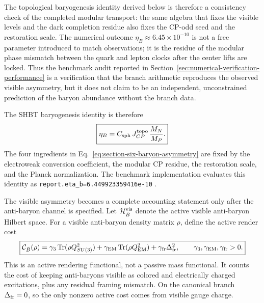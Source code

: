 \documentclass[11pt]{article}
\DeclareMathOperator{\Tr}{Tr}
\DeclareRobustCommand{\pyvar}[1]{%
  \ifmmode\text{\nolinkurl{#1}}\else\nolinkurl{#1}\fi%
}
\newcommand{\Deltafr}{\Delta_{\rm fr}}
\newcommand{\MP}{M_P}
\begin{document}
The topological baryogenesis identity derived below is therefore a consistency
check of the completed modular transport: the same algebra that fixes the
visible levels and the dark completion residue also fixes the CP-odd seed and
the restoration scale.  The numerical outcome \(\eta_B\approx6.45\times10^{-10}\)
is not a free parameter introduced to match observations; it is the residue of
the modular phase mismatch between the quark and lepton clocks after the center
lifts are locked.  Thus the benchmark audit reported in
Section~\ref{sec:numerical-verification-performance} is a verification that the
branch arithmetic reproduces the observed visible asymmetry, but it does not
claim to be an independent, unconstrained prediction of the baryon abundance
without the branch data.

The SHBT baryogenesis identity is therefore
\begin{equation}
\label{eq:section-six-baryon-asymmetry}
 \boxed{
 \eta_B
 =
 C_{\rm sph}\,J_{CP}^{\rm topo}\,\frac{M_N}{\MP}.
 }
\end{equation}
The four ingredients in Eq.~\eqref{eq:section-six-baryon-asymmetry} are fixed
by the electroweak conversion coefficient, the modular CP residue, the
restoration scale, and the Planck normalization.  The benchmark implementation
evaluates this identity as \pyvar{report.eta_b=6.449923359416e-10}.

The visible asymmetry becomes a complete accounting statement only after the
anti-baryon channel is specified.  Let $\mathcal H_{\bar B}^{\rm vis}$ denote
the active visible anti-baryon Hilbert space.  For a visible anti-baryon density
matrix $\rho$, define the active render cost
\begin{equation}
\label{eq:section-six-active-render-cost}
 \boxed{
 \mathcal C_{\bar B}(\rho)
 =
 \gamma_3\Tr(\rho Q_{SU(3)}^2)
 +
 \gamma_{\rm EM}\Tr(\rho Q_{\rm EM}^2)
 +
 \gamma_{\rm fr}\Deltafr^2,
 \qquad
 \gamma_3,\gamma_{\rm EM},\gamma_{\rm fr}>0.
 }
\end{equation}
This is an active rendering functional, not a passive mass functional.  It
counts the cost of keeping anti-baryons visible as colored and electrically
charged excitations, plus any residual framing mismatch.  On the canonical
branch $\Deltafr=0$, so the only nonzero active cost comes from visible gauge
charge.
\end{document}
